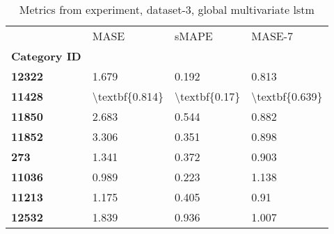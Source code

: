 \begin{table}[h]
\centering
\caption{Metrics from experiment, dataset-3, global multivariate lstm}
\label{table:global-multivariate-lstm-dataset-3}
\begin{tabular}{llll}
\toprule
{} &            MASE &          sMAPE &          MASE-7 \\
\textbf{Category ID} &                 &                &                 \\
\midrule
\textbf{12322      } &           1.679 &          0.192 &           0.813 \\
\textbf{11428      } &  \textbackslash textbf\{0.814\} &  \textbackslash textbf\{0.17\} &  \textbackslash textbf\{0.639\} \\
\textbf{11850      } &           2.683 &          0.544 &           0.882 \\
\textbf{11852      } &           3.306 &          0.351 &           0.898 \\
\textbf{273        } &           1.341 &          0.372 &           0.903 \\
\textbf{11036      } &           0.989 &          0.223 &           1.138 \\
\textbf{11213      } &           1.175 &          0.405 &            0.91 \\
\textbf{12532      } &           1.839 &          0.936 &           1.007 \\
\bottomrule
\end{tabular}
\end{table}
